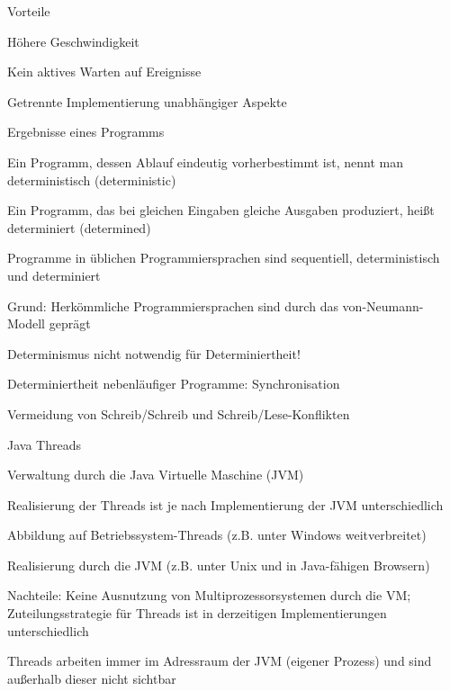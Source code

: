 \documentclass[a4paper]{article}
\begin{document}
\begin{multicols}{3}
  Vorteile
  \begin{itemize*}
    \item Höhere Geschwindigkeit
    \item Kein aktives Warten auf Ereignisse
    \item Getrennte Implementierung unabhängiger Aspekte
  \end{itemize*}

  Ergebnisse eines Programms
  \begin{itemize*}
    \item Ein Programm, dessen Ablauf eindeutig vorherbestimmt ist, nennt man deterministisch (deterministic)
    \item Ein Programm, das bei gleichen Eingaben gleiche Ausgaben produziert, heißt determiniert (determined)
    \item Programme in üblichen Programmiersprachen sind sequentiell, deterministisch und determiniert
    \item Grund: Herkömmliche Programmiersprachen sind durch das von-Neumann-Modell geprägt
    \item Determinismus nicht notwendig für Determiniertheit!
    \begin{itemize*}
      \item Determiniertheit nebenläufiger Programme: Synchronisation
      \item Vermeidung von Schreib/Schreib und Schreib/Lese-Konflikten
    \end{itemize*}
  \end{itemize*}

  Java Threads
  \begin{itemize*}
    \item Verwaltung durch die Java Virtuelle Maschine (JVM)
    \item Realisierung der Threads ist je nach Implementierung der JVM unterschiedlich
    \begin{itemize*}
      \item Abbildung auf Betriebssystem-Threads (z.B. unter Windows weitverbreitet)
      \item Realisierung durch die JVM (z.B. unter Unix und in Java-fähigen Browsern)
      \item Nachteile: Keine Ausnutzung von Multiprozessorsystemen durch die VM; Zuteilungsstrategie für Threads ist in derzeitigen Implementierungen unterschiedlich
    \end{itemize*}
    \item Threads arbeiten immer im Adressraum der JVM (eigener Prozess) und sind außerhalb dieser nicht sichtbar
  \end{itemize*}


\end{multicols}
\end{document}
